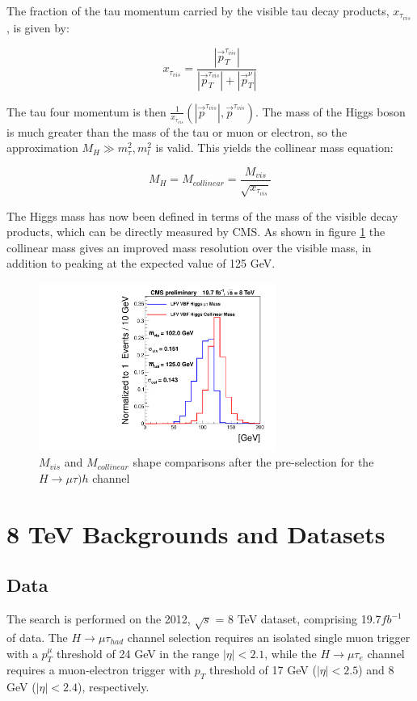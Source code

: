 \documentclass[oneside, letterpaper, oldfontcommands]{memoir}
\begin{document}
The fraction of the tau momentum carried by the visible tau decay products, $x_{\tau_{vis}}$, is given by:

\begin{equation}
x_{\tau_{vis}} = \frac{|\vec{p}_{T}^{\tau_{vis}}|}{|\vec{p}_{T}^{\tau_{vis}}| + |\vec{p}_{T}^{\nu}|}
\end{equation}

The tau four momentum is then $\frac{1}{x_{\tau_{vis}}}\left(|\vec{p}^{\tau_{vis}}|,\vec{p}^{\tau_{vis}}\right)$. The mass of the Higgs boson is much greater than the mass of the tau or muon or electron, so the approximation $M_{H} \gg m_{\tau}^2,m_{l}^2$ is valid. This yields the collinear mass equation:

\begin{equation} 
M_{H} = M_{collinear} = \frac{M_{vis}}{\sqrt{x_{\tau_{vis}}}}
\end{equation}

The Higgs mass has now been defined in terms of the mass of the visible decay products, which can be directly measured by CMS. As shown in figure \ref{fig:MvisMcol} the collinear mass gives an improved mass resolution over the visible mass, in addition to peaking at the expected value of 125 GeV. 

\begin{figure}[hbtp]\begin{center}
\includegraphics[height=5.5cm]{masses_muhad_VBF_After_Presel_signal.pdf}
 \caption{$M_{vis}$  and $M_{collinear}$  shape comparisons after the pre-selection for the $H \rightarrow \mu\tau){h}$ channel}
 \label{fig:MvisMcol}\end{center}\end{figure}

\section{8 TeV Backgrounds and Datasets}
\subsection{Data}
\qquad The search is performed on the 2012, $\sqrt{s}$ = 8 TeV dataset, comprising 19.7$fb^{-1}$ of data. The $H \rightarrow \mu\tau_{had}$ channel selection requires an isolated single muon trigger with a $p_{T}^{\mu}$ threshold of 24 GeV in the range $|\eta| < 2.1$, while the $H \rightarrow \mu\tau_{e}$ channel requires a muon-electron trigger with $p_{T}$ threshold of 17 GeV ($|\eta| < 2.5$) and 8 GeV ($|\eta| < 2.4$), respectively. 
\end{document}
